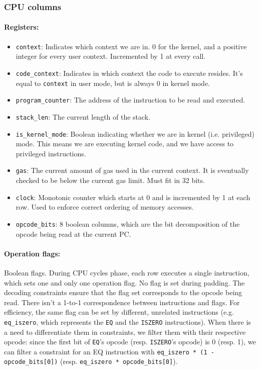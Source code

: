 \subsubsection{CPU columns}

\paragraph*{Registers:} \begin{itemize}
    \item \texttt{context}: Indicates which context we are in. 0 for the kernel, and a positive integer for every user context. Incremented by 1 at every call.
    \item \texttt{code\_context}: Indicates in which context the code to execute resides. It's equal to \texttt{context} in user mode, but is always 0 in kernel mode.
    \item \texttt{program\_counter}: The address of the instruction to be read and executed.
    \item \texttt{stack\_len}: The current length of the stack.
    \item \texttt{is\_kernel\_mode}: Boolean indicating whether we are in kernel (i.e. privileged) mode. This means we are executing kernel code, and we have access to
privileged instructions.
    \item \texttt{gas}: The current amount of gas used in the current context. It is eventually checked to be below the current gas limit. Must fit in 32 bits.
    \item \texttt{clock}: Monotonic counter which starts at 0 and is incremented by 1 at each row. Used to enforce correct ordering of memory accesses. 
    \item \texttt{opcode\_bits}: 8 boolean columns, which are the bit decomposition of the opcode being read at the current PC.
\end{itemize}

\paragraph*{Operation flags:} Boolean flags. During CPU cycles phase, each row executes a single instruction, which sets one and only one operation flag. No flag is set during
padding. The decoding constraints ensure that the flag set corresponds to the opcode being read.
There isn't a 1-to-1 correspondence between instructions and flags. For efficiency, the same flag can be set by different, unrelated instructions (e.g. \texttt{eq\_iszero}, which represents
the \texttt{EQ} and the \texttt{ISZERO} instructions). When there is a need to differentiate them in constraints, we filter them with their respective opcode: since the first bit of \texttt{EQ}'s opcode
(resp. \texttt{ISZERO}'s opcode) is 0 (resp. 1), we can filter a constraint for an EQ instruction with \texttt{eq\_iszero * (1 - opcode\_bits[0])}
(resp. \texttt{eq\_iszero * opcode\_bits[0]}).

